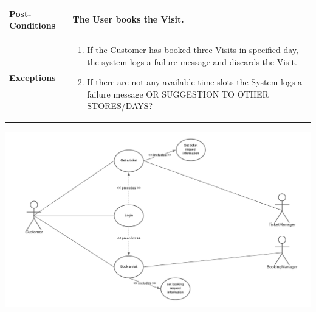 \documentclass[a4paper, 10pt, oneside]{article}
\newcommand*{\lorenzo}[1]{\textcolor{BurntOrange}{#1}}
\begin{document}
\begin{tabularx}{\linewidth}{| l | X |}
	\hline
	\textbf{Post-Conditions} & The User books the Visit.\\
	
	\hline
	\textbf{Exceptions} & \parbox{0.7\textwidth}{ \begin{enumerate}
			\item If the Customer has booked three Visits in specified day, the system logs a failure message and discards the Visit.
			\item If there are not any available time-slots the System logs a failure message \lorenzo{OR SUGGESTION TO OTHER STORES/DAYS?}
		\end{enumerate}}\\

	\hline
	
\end{tabularx}

\begin{minipage}{\linewidth}
        \centering
           \includegraphics[height=0.4\textheight, scale=0.1, keepaspectratio]{img/book_ticket_use_diagram.png}
        \end{minipage}
\end{document}

